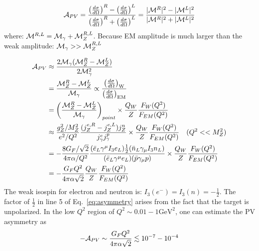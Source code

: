 \begin{equation}
    \mathcal{A}_{PV} = \frac{\left( \frac{d\sigma}{d\Omega} \right)^R - \left( \frac{d\sigma}{d\Omega} \right)^L}
    {\left( \frac{d\sigma}{d\Omega} \right)^R + \left( \frac{d\sigma}{d\Omega} \right)^L}
    = \frac{|\mathcal{M}^R|^2 - |\mathcal{M}^L|^2}{|\mathcal{M}^R|^2 + |\mathcal{M}^L|^2}
\end{equation}
where: $\mathcal{M}^{R, L} = \mathcal{M}_{\gamma} + \mathcal{M}_Z^{R,L}$. Because EM amplitude is much 
larger than the weak amplitude: $\mathcal{M}_\gamma >> \mathcal{M}_Z^{R, L}$

\begin{equation}
    \begin{aligned}
	\mathcal{A}_{PV} &\approx \frac{2\mathcal{M}_\gamma (\mathcal{M}_Z^R - \mathcal{M}_Z^L)}{2\mathcal{M}^2_\gamma}	\\
	    &= \frac{\mathcal{M}_Z^R - \mathcal{M}_Z^L}{\mathcal{M}_\gamma} \propto \frac{\left( \frac{d\sigma}{d\Omega} \right)_{\text{W}}}{\left( \frac{d\sigma}{d\Omega} \right)_{\text{EM}}}	\\
	    &= \left(\frac{\mathcal{M}_Z^R - \mathcal{M}_Z^L}{\mathcal{M}_\gamma}\right)_{point} \times \frac{Q_{W}}{Z}\frac{F_{W}(Q^2)}{F_{EM}(Q^2)}    \\
	    &\approx \frac{g^2_Z/M_Z^2}{e^2/Q^2} \frac{(j_Z^{e,R} - j_Z^{e,L}) j_Z^n}{j_\gamma^e j_\gamma^p}
		\times \frac{Q_{W}}{Z}\frac{F_{W}(Q^2)}{F_{EM}(Q^2)} 	\quad (Q^2 << M_Z^2) \\
	    &= -\frac{8G_F/\sqrt{2}}{4\pi\alpha/Q^2} 
		\frac{(\bar{e}_L\gamma^\mu I_3e_L) \frac{1}{2}(\bar{n}_L \gamma_\mu I_3 n_L)}{(\bar{e}_L\gamma^\mu e_L)(\bar{p}\gamma_\mu p)}
		\times \frac{Q_{W}}{Z}\frac{F_{W}(Q^2)}{F_{EM}(Q^2)}    \\
	    &= -\frac{G_F Q^2}{4\pi\alpha\sqrt{2}} \frac{Q_{W}}{Z}\frac{F_{W}(Q^2)}{F_{EM}(Q^2)}
    \end{aligned}
    \label{eq:asymmetry}
\end{equation}
The weak isospin for electron and neutron is: $I_3(e^-) = I_3(n) = -\frac{1}{2}$.
The factor of $\frac{1}{2}$ in line 5 of Eq.~\ref{eq:asymmetry} arises from
the fact that the target is unpolarized. In the low $Q^2$ region of $Q^2 \sim 0.01 - 1 \mathrm{GeV} ^2$,
one can estimate the PV asymmetry as 
\begin{equation}
    -\mathcal{A}_{PV} \sim \frac{G_F Q^2}{4\pi\alpha \sqrt{2}} \lesssim 10^{-7} - 10^{-4}
\end{equation}

